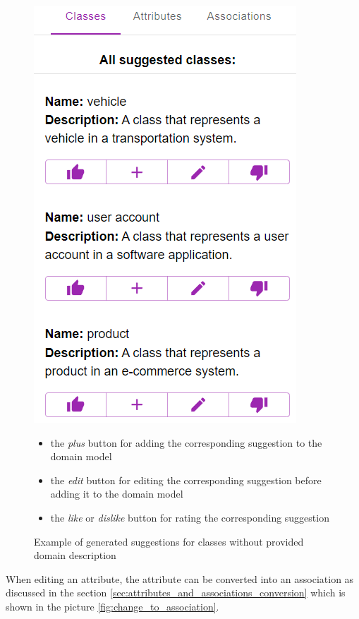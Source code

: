 \begin{figure}[H]
    \includegraphics[scale=0.47]{../docs/images/frontend/suggested-classes.png} \\
    \begin{itemize}
    \item the \textit{plus} button for adding the corresponding suggestion to the domain model
    \item the \textit{edit} button for editing the corresponding suggestion before adding it to the domain model
    \item the \textit{like} or \textit{dislike} button for rating the corresponding suggestion
    \end{itemize}
    \caption{\centering Example of generated suggestions for classes without provided domain description}
    \label{fig:suggested_classes}
\end{figure}


When editing an attribute, the attribute can be converted into an association as discussed in the section \ref{sec:attributes_and_associations_conversion} which is shown in the picture \ref{fig:change_to_association}.

